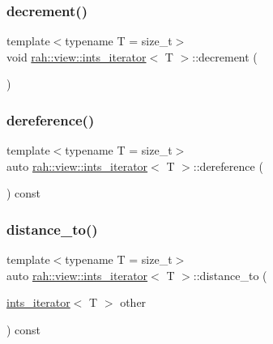\mbox{\label{structrah_1_1view_1_1ints__iterator_a08516717bcf1a7e7569863aa05b19392}} 
\subsubsection{\texorpdfstring{decrement()}{decrement()}}
{\footnotesize\ttfamily template$<$typename T  = size\+\_\+t$>$ \\
void \mbox{\hyperlink{structrah_1_1view_1_1ints__iterator}{rah\+::view\+::ints\+\_\+iterator}}$<$ T $>$\+::decrement (\begin{DoxyParamCaption}{ }\end{DoxyParamCaption})\hspace{0.3cm}{\ttfamily [inline]}}

\mbox{\label{structrah_1_1view_1_1ints__iterator_ae63cf37f8a217c36a69412ec4de47374}} 
\subsubsection{\texorpdfstring{dereference()}{dereference()}}
{\footnotesize\ttfamily template$<$typename T  = size\+\_\+t$>$ \\
auto \mbox{\hyperlink{structrah_1_1view_1_1ints__iterator}{rah\+::view\+::ints\+\_\+iterator}}$<$ T $>$\+::dereference (\begin{DoxyParamCaption}{ }\end{DoxyParamCaption}) const\hspace{0.3cm}{\ttfamily [inline]}}

\mbox{\label{structrah_1_1view_1_1ints__iterator_affcacb2301246c7c9972c06a86b952ce}} 
\subsubsection{\texorpdfstring{distance\_to()}{distance\_to()}}
{\footnotesize\ttfamily template$<$typename T  = size\+\_\+t$>$ \\
auto \mbox{\hyperlink{structrah_1_1view_1_1ints__iterator}{rah\+::view\+::ints\+\_\+iterator}}$<$ T $>$\+::distance\+\_\+to (\begin{DoxyParamCaption}\item[{\mbox{\hyperlink{structrah_1_1view_1_1ints__iterator}{ints\+\_\+iterator}}$<$ T $>$}]{other }\end{DoxyParamCaption}) const\hspace{0.3cm}{\ttfamily [inline]}}

